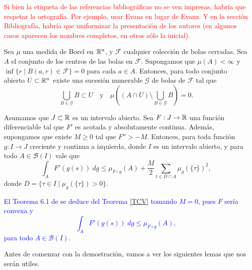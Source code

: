 \textcolor{red}{Si bien la etiqueta de las referencias bibliográficas no se ven impresas, habría que respetar la ortografía. Por ejemplo, usar Evans  en lugar de Evanz.
Y en la sección Bibliografía, habría que uniformizar la presentación de los autores (en algunos casos aparecen los nombres completos, en otros sólo la inicial).}

\begin{lem}
	\label{Lema de  cubrimiento}
	Sea $\mu$ una medida de Borel en $\mathbb{R}^n$, y $\mathcal{F} $ cualquier colección de bolas cerradas. Sea $A$ el conjunto de los centros de las bolas en $\mathcal{F} $. Supongamos que $\mu(A)<\infty$ y $\inf\{r\mid B(a,r)\in \mathcal{F} \}=0$ para cada $a\in A$.  Entonces, para todo conjunto abierto $U\subset\mathbb{R}^n$ existe una sucesión numerable $\mathcal{G} $ de bolas de $\mathcal{F} $ tal que 
	\begin{equation*}
		\bigcup_{B\in \mathcal{G} }B\subset U \quad \text{y}\quad \mu\left( (A\cap U)\setminus\bigcup_{B\in \mathcal{G} }B\right)=0. 
	\end{equation*}
	
	
\end{lem}




\begin{thm}\label{TCV}
Asumamos que $J\subset\mathbb{R}$ es un intervalo abierto. Sea $F:J\to \mathbb{R}$ una función diferenciable tal que $F'$ es acotada y absolutamente continua. Además,  supongamos que existe $M\geq 0$ tal que $F''>-M$. Entonces, para toda función $g:I\to J$ creciente y  continua a izquierda,  donde $I$ es un intervalo abierto, y para todo $A\in \mathcal{B}(I)$ vale que
$$\int_{A}F'(g(s)) \; dg\leq \mu_{F\circ g}(A)+\dfrac{M}{2}\sum_{t\in D\cap A}\mu_{g}(\{\tau\})^2,$$
donde $D=\{\tau\in I \mid \mu_{g}(\{\tau\})>0\}$.\label{Teorema medidas}
\end{thm}
\begin{obs} \label{Teorema 6.1}
\textcolor{blue}{El Teorema 6.1  de \cite{P.Mazzone} se deduce del Teorema  \ref{TCV} tomando $M=0$, pues $F$ sería convexa y 
$$\int_{A}F'(g(s)) \; dg\leq \mu_{F\circ g}(A),$$
para todo $A\in \mathcal{B}(I)$.}
\end{obs}
Antes de comenzar con la demostración, vamos a ver los siguientes lemas que nos serán utiles.

